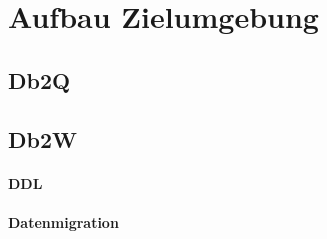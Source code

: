 \chapter[Migration]{Aufbau Zielumgebung}

\section{Db2Q}
\loreipsum

\section{Db2W}
\loreipsum

\subsubsection{DDL}
\loreipsum

\subsubsection{Datenmigration}
\loreipsum

